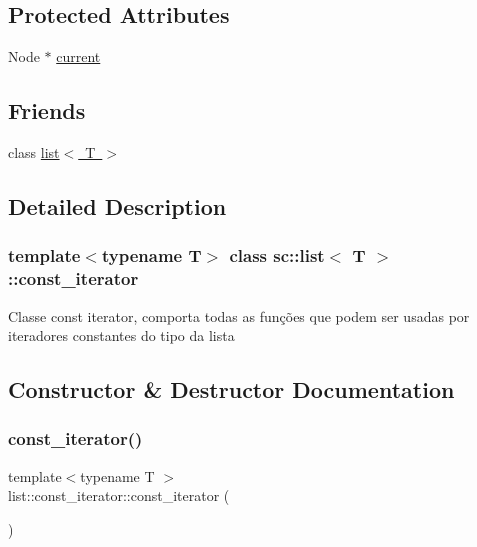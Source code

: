 \subsection*{Protected Attributes}
\begin{DoxyCompactItemize}
\item 
Node $\ast$ \mbox{\hyperlink{classsc_1_1list_1_1const__iterator_ac8a1ecff3dcc804cd3fabfaf2360d461}{current}}
\end{DoxyCompactItemize}
\subsection*{Friends}
\begin{DoxyCompactItemize}
\item 
class \mbox{\hyperlink{classsc_1_1list_1_1const__iterator_ab6cf03d50c50087700b0fb872accfa7b}{list$<$ T $>$}}
\end{DoxyCompactItemize}


\subsection{Detailed Description}
\subsubsection*{template$<$typename T$>$\newline
class sc\+::list$<$ T $>$\+::const\+\_\+iterator}

Classe const iterator, comporta todas as funções que podem ser usadas por iteradores constantes do tipo da lista 

\subsection{Constructor \& Destructor Documentation}
\mbox{\label{classsc_1_1list_1_1const__iterator_a54f14844dda37c2ebd95c7c6d7fe686d}} 
\subsubsection{\texorpdfstring{const\+\_\+iterator()}{const\_iterator()}\hspace{0.1cm}{\footnotesize\ttfamily [1/2]}}
{\footnotesize\ttfamily template$<$typename T $>$ \\
list\+::const\+\_\+iterator\+::const\+\_\+iterator (\begin{DoxyParamCaption}{ }\end{DoxyParamCaption})}

